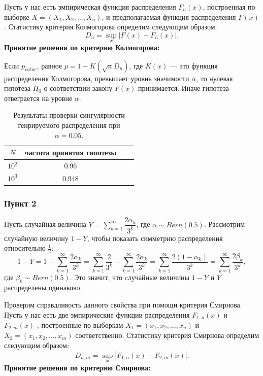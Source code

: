 \documentclass[oneside, final, 12pt]{article}
\begin{document}
	Пусть у нас есть эмпирическая функция распределения $F_n(x)$,
	построенная по выборке $X = (X_1, X_2, \ldots, X_n)$, и предполагаемая функция
	распределения $F(x)$. Статистику критерия Колмогорова определим
	следующим образом: $$D_n = \sup\limits_{x}|F(x) - F_n(x)|.$$ 
		\textbf{Принятие решения по критерию Колмогорова:}

	Если $p_{value}$, равное $p = 1 - K(\sqrt {n}D_{n})$,
	где $K(x)$ --- это функция распределения Колмогорова, превышает уровнь
	значимости $\alpha$, то нулевая гипотеза $H_{0}$ 
	о соответствии закону $F(x)$ принимается. 
	Иначе гипотеза отвеграется на уровне $\alpha$.

	\begin{table}[h!]
	\begin{center}
		\begin{tabular}{|c|c|c|c|}
			\hline $N$ & частота принятия гипотезы \\ \hline
				$10^2$ & 0.96  \\ \hline
				$10^3$ & 0.948 \\ \hline
		\end{tabular}
		\caption{Результаты проверки сингулярности генрируемого распределения при $\alpha = 0.05$.}
	\end{center}
	\end{table}
	
\newpage
\subsubsection{Пункт 2}
	
		Пусть случайная величина $Y= \sum\limits_{k=1}^{\infty}\dfrac{2\alpha_k}{3^k}$, 
	где $\alpha\sim Bern(0.5)$. Рассмотрим случайную величину $1-Y$, чтобы показать симметрию
	распределения относительно $\frac{1}{2}$:
	$$
		1- Y= 1- \sum\limits_{k=1}^{\infty}\dfrac{2\alpha_k}{3^k} =
					 \sum\limits_{k=1}^{\infty}\dfrac{2}{3^k} - \sum\limits_{k=1}^{\infty}\dfrac{2\alpha_k}{3^k} = 
				    \sum\limits_{k=1}^{\infty}\dfrac{2(1-\alpha_k)}{3^k} =
					 \sum\limits_{k=1}^{\infty}\dfrac{2\beta_k}{3^k}, 
	$$
	где $\beta_k \sim Bern(0.5)$. Это значит, что cлучайные величины $1-Y$  и $Y$ распределены одинаково. 

	Проверим справдливость данного свойства при помощи критерия Смирнова. 
	Пусть у нас есть две эмпирические функции распределения $F_{1,n}(x)$ и $F_{2,m}(x)$ ,
	построенные по выборкам $X_1 = (x_1, x_2, \ldots, x_n)$ и $X_2 = (x_1, x_2, \ldots, x_m)$ соответственно.
	Статистику критерия Смирнова определим следующим образом:
	$$D_{n,m} = \sup\limits_{x}|F_{1,n}(x) - F_{2,m}(x)|.$$
	\textbf{Принятие решения по критерию Смирнова:}
\end{document}
